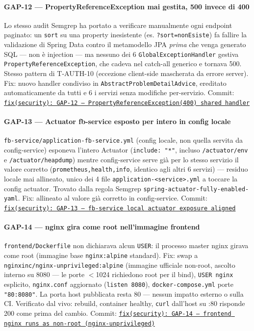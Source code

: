 ﻿\documentclass[a4paper,12pt]{report}
\newcommand{\commitref}[2]{\texttt{\small \href{https://github.com/diegoandruccioli/hotel-pms/commit/#1}{#2}}}
\begin{document}
\paragraph{GAP-12 --- PropertyReferenceException mai gestita, 500 invece di 400}
Lo stesso audit Semgrep ha portato a verificare manualmente ogni endpoint paginato:
un \texttt{sort} su una property inesistente (es. \texttt{?sort=nonEsiste}) fa fallire
la validazione di Spring Data contro il metamodello JPA \emph{prima} che venga generato
SQL — non è injection — ma nessuno dei 6 \texttt{GlobalExceptionHandler} gestiva
\texttt{PropertyReferenceException}, che cadeva nel catch-all generico e tornava 500.
Stesso pattern di T-AUTH-10 (eccezione client-side mascherata da errore server). Fix:
nuovo handler condiviso in \texttt{AbstractProblemDetailAdvice}, ereditato
automaticamente da tutti e 6 i servizi senza modifiche per-servizio.
Commit: \commitref{3fc4b07}{fix(security): GAP-12 --- PropertyReferenceException(400) shared handler}

\paragraph{GAP-13 --- Actuator fb-service esposto per intero in config locale}
\texttt{fb-service/application-fb-service.yml} (config locale, non quella servita da
config-service) esponeva l'intero Actuator (\texttt{include: "*"}, incluso
\texttt{/actuator/env} e \texttt{/actuator/heapdump}) mentre config-service serve già
per lo stesso servizio il valore corretto (\texttt{prometheus,health,info}, identico
agli altri 6 servizi) — residuo locale mai allineato, unico dei 4 file
\texttt{application-<service>.yml} a toccare la config actuator. Trovato dalla regola
Semgrep \texttt{spring-actuator-fully-enabled-yaml}. Fix: allineato al valore già
corretto in config-service.
Commit: \commitref{c2992c2}{fix(security): GAP-13 --- fb-service local actuator exposure aligned}

\paragraph{GAP-14 --- nginx gira come root nell'immagine frontend}
\texttt{frontend/Dockerfile} non dichiarava alcun \texttt{USER}: il processo master
nginx girava come root (immagine base \texttt{nginx:alpine} standard). Fix: swap a
\texttt{nginxinc/nginx-unprivileged:alpine} (immagine ufficiale non-root, ascolto
interno su 8080 — le porte $<$1024 richiedono root per il bind), \texttt{USER nginx}
esplicito, \texttt{nginx.conf} aggiornato (\texttt{listen 8080}),
\texttt{docker-compose.yml} porte \texttt{"80:8080"}. La porta host pubblicata resta 80
— nessun impatto esterno o sulla CI. Verificato dal vivo: rebuild, container healthy,
\texttt{curl} dall'host su :80 risponde 200 come prima del cambio.
Commit: \commitref{a4df5c2}{fix(security): GAP-14 --- frontend nginx runs as non-root (nginx-unprivileged)}
\end{document}
